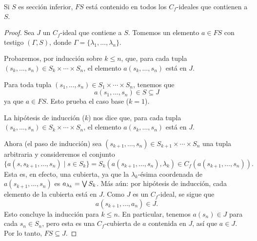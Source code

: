 \begin{lemma}
  Si $S$ es sección inferior, $FS$ está contenido en todos los
  $C_f$-ideales que contienen a $S$.
\end{lemma}

\begin{proof}
  Sea $J$ un $C_f$-ideal que contiene a $S$.
  Tomemos un elemento $a\in FS$ con testigo $(\Gamma,S)$, donde
  $\Gamma=\{\lambda_1,\dots,\lambda_n\}$.

  Probaremos, por inducción sobre $k\leq n$, que, para cada tupla
  $(s_k,\dots,s_n)\in S_k\times\cdots\times S_n$, el elemento
  $a(s_k,\dots,s_n)$ está en $J$.

  Para toda tupla
  $(s_1,\dots,s_n)\in S_1\times\cdots\times S_n$, tenemos que
  \[
    a(s_1,\dots,s_n)\in S\subseteq J
  \]
  ya que $a\in FS$.
  Esto prueba el caso base ($k=1$).

  La hipótesis de inducción ($k$) nos dice que, para cada tupla
  $(s_k,\dots,s_n)\in S_k\times\cdots\times S_n$,
  el elemento $a(s_k,\dots,s_n)$ está en $J$.

  Ahora (el paso de inducción)
  sea $(s_{k+1},\dots,s_n)\in S_{k+1}\times\cdots\times S_n$
  una tupla arbitraria y consideremos el conjunto
  \[
    \{a(s,s_{k+1},\dots,s_n) \mid s\in S_k\}
    =
    S_k(a(s_{k+1},\dots,s_n),\lambda_k)
    \in
    C_f(a(s_{k+1},\dots,s_n))
  .\]
  Esta es, en efecto, una cubierta, ya que la $\lambda_k$-ésima
  coordenada de $a(s_{k+1},\dots,s_n)$ es $a_{\lambda_k}=\bigvee S_k$.
  Más aún: por hipótesis de inducción, cada elemento
  de la cubierta está en $J$.
  Como $J$ es un $C_f$-ideal, se sigue que
  \[
    a(s_{k+1},\dots,a_n) \in J
  .\]
  Esto concluye la inducción para $k\leq n$.
  En particular, tenemos $a(s_n)\in J$ para cada $s_n\in S_n$,
  pero esta es una $C_f$-cubierta de $a$ contenida en $J$,
  así que $a\in J$.
  Por lo tanto, $FS\subseteq J$.
\end{proof}

